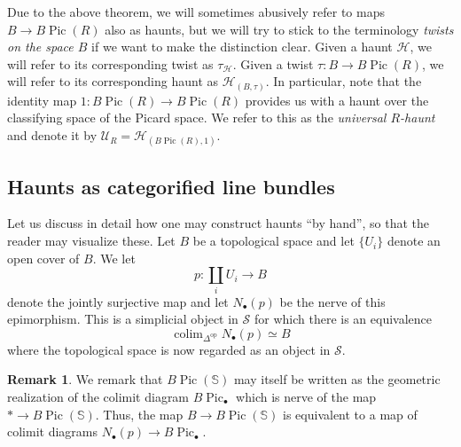 \documentclass[10pt]{amsart}
\theoremstyle{plain}
\theoremstyle{definition}
\newtheorem{rmk}[theorem]{Remark}
\DeclareMathOperator*{\colim}{colim}
\DeclareMathOperator{\Pic}{Pic}
\newcommand{\oop}{\mathrm{op}}
\newcommand{\bS}{\mathbb{S}}
\newcommand{\cH}{\mathcal{H}}
\newcommand{\cS}{\mathcal{S}}
\begin{document}
Due to the above theorem, we will sometimes abusively refer to maps $B \to B\Pic(R)$ also as haunts, but we will try to stick to the terminology \emph{twists on the space $B$} if we want to make the distinction clear.
Given a haunt $\cH$, we will refer to its corresponding twist as $\tau_{\cH}$.
Given a twist $\tau : B \to B\Pic(R)$, we will refer to its corresponding haunt as $\cH_{(B,\tau)}$.
In particular, note that the identity map $1 : B\Pic(R) \to B\Pic(R)$ provides us with a haunt over the classifying space of the Picard space.
We  refer to this as the \emph{universal $R$-haunt} and denote it by $\mathcal{U}_R = \cH_{(B\Pic(R),1)}$.

\subsection{Haunts as categorified line bundles}
Let us discuss in detail how one may construct haunts ``by hand'', so that the reader may visualize these.
Let $B$ be a topological space and let $\{U_{i}\}$ denote an open cover of $B$.
We let
\[
p: \coprod_i U_i \to B
\]
denote the jointly surjective map and let $N_{\bullet}(p)$ be the nerve of this epimorphism.
This is a simplicial object in $\cS$ for which there is an equivalence
$$
\colim_{\Delta^{\oop}}N_{\bullet}(p) \simeq B
$$
where the topological space is now regarded as an object in $\cS$.

\begin{rmk} \label{cosimplicial shit}
We remark that $B \Pic(\bS)$ may itself be written as the geometric realization of the colimit diagram $B\Pic_{\bullet}$ which is nerve of the map $* \to B \Pic(\bS)$.
Thus, the map $B \to B \Pic(\bS)$ is equivalent to a map of colimit diagrams $N_{\bullet}(p) \to B \Pic_{\bullet}$.
\end{rmk}
\end{document}
